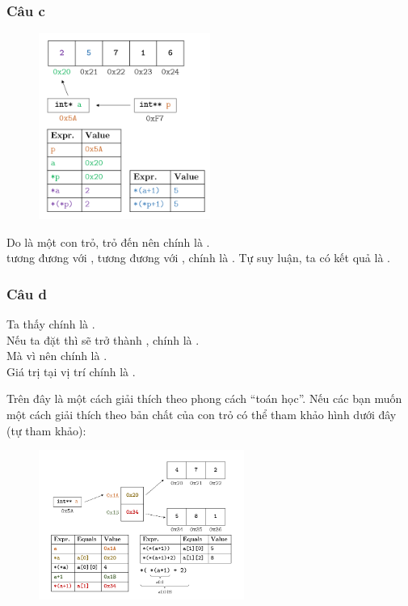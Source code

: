 \documentclass[main.tex]{subfiles}
\begin{document}
\subsubsection{Câu c}
\begin{figure}[H]
\centering
\includegraphics[width=0.5\textwidth]{image/ans_CTRLCB_c.png}
\end{figure}

Do  là một con trỏ, trỏ đến  nên  chính là . \\
 tương đương với ,  tương đương với , chính là . Tự suy luận, ta có kết quả là .

\subsubsection{Câu d}
Ta thấy  chính là . \\
Nếu ta đặt  thì  sẽ trở thành , chính là .\\
Mà vì  nên  chính là .\\
Giá trị tại vị trí  chính là .

Trên đây là một cách giải thích theo phong cách ``toán học''. Nếu các bạn muốn một cách giải thích theo bản chất của con trỏ có thể tham khảo hình dưới đây (tự tham khảo):
\begin{figure}
\includegraphics[width=0.6\textwidth]{image/ans_CTRLCB_d.png}
\end{figure}
\end{document}

